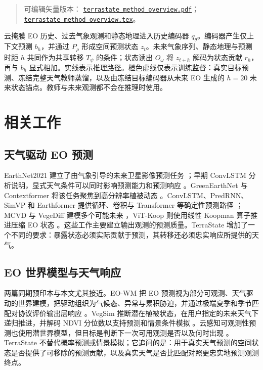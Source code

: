 \documentclass[11pt,a4paper,fontset=fandol]{ctexart}
\begin{document}
\begin{quote}\small
可编辑矢量版本： \href{../paper/figures/terrastate\_method\_overview.pdf}{\texttt{terrastate\_method\_overview.pdf}}； \href{../paper/figures/terrastate\_method\_overview.tex}{\texttt{terrastate\_method\_overview.tex}}。
\end{quote}

云掩膜 EO 历史、过去气象观测和静态地理进入历史编码器 $q_\theta$。编码器产生仅上下文预测 $b_h$，并通过 $P_\rho$ 形成空间预测状态 $z_t$。未来气象序列、静态地理与预测时距 $h$ 共同作为共享转移 $T_\psi$ 的条件；状态读出 $O_\omega$ 将 $z_{t+h}$ 解码为状态贡献 $r_h$，再与 $b_h$ 显式相加。实线表示推理路径。橙色虚线仅表示训练监督：真实目标预测、冻结完整天气教师蒸馏，以及由冻结目标编码器从未来 EO 生成的 $h=20$ 未来状态锚点。教师与未来观测都不会在推理时使用。

\section{相关工作}

\subsection{天气驱动 EO 预测}

EarthNet2021 建立了由气象引导的未来卫星影像预测任务 \cite{requenamesa2021earthnet}；早期 ConvLSTM 分析说明，显式天气条件可以同时影响预测能力和预测响应 \cite{diaconu2022weather}。GreenEarthNet 与 Contextformer 将该任务聚焦到高分辨率植被动态 \cite{benson2024multimodal}。ConvLSTM、PredRNN、SimVP 和 Earthformer 提供循环、卷积与 Transformer 等确定性预测路径 \cite{shi2015convlstm,wang2017predrnn,gao2022simvp,gao2022earthformer}；MCVD 与 VegeDiff 建模多个可能未来 \cite{voleti2022mcvd,zhao2024vegediff}，ViT-Koop 则使用线性 Koopman 算子推进压缩 EO 状态 \cite{shinohara2025vitkoop}。这些工作主要建立输出观测的预测质量。TerraState 增加了一个不同的要求：暴露状态必须实际贡献于预测，其转移还必须忠实响应所提供的天气。

\subsection{EO 世界模型与天气响应}

两篇同期预印本与本文尤其接近。EO-WM 把 EO 预测视为部分可观测、天气驱动的世界建模，把驱动组织为气候态、异常与累积胁迫，并通过极端夏季和季节匹配对协议评价输出层响应 \cite{luo2026eowm}。VegSim 推断潜在植被状态，在用户指定的未来天气下递归推进，并解码 NDVI 分位数以支持预测和情景条件模拟 \cite{iele2026vegsim}。云感知可观测性预测也使用潜世界模型，但目标是判断下一次可用观测是否以及何时出现 \cite{albughdadi2026observability}。TerraState 不替代概率预测或情景模拟；它追问的是：用于真实天气预测的空间状态是否提供了可移除的预测贡献，以及真实天气是否比匹配对照更忠实地预测观测终点。
\end{document}
